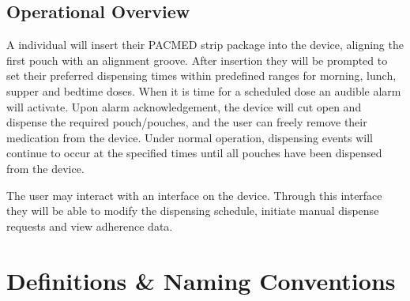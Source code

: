 \documentclass[12pt]{article}
\begin{document}
\subsection{Operational Overview}
A individual will insert their PACMED strip package into the device, aligning the first pouch with an alignment groove. After insertion they will be prompted to set their preferred dispensing times within predefined ranges for morning, lunch, supper and bedtime doses. When it is time for a scheduled dose an audible alarm will activate. Upon alarm acknowledgement, the device will cut open and dispense the required pouch/pouches, and the user can freely remove their medication from the device. Under normal operation, dispensing events will continue to occur at the specified times until all pouches have been dispensed from the device. \par
The user may interact with an interface on the device. Through this interface they will be able to modify the dispensing schedule, initiate manual dispense requests and view adherence data.

\pagebreak

\section{Definitions \& Naming Conventions}
\end{document}
